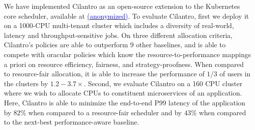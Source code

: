 
We have implemented Cilantro as an open-source extension to the Kubernetes core scheduler, available at \href{https://github.com}{\textcolor{blue}{(anonymized)}}. To evaluate Cilantro, first we deploy it on a 1000-CPU multi-tenant cluster which includes a diversity of real-world, latency and throughput-sensitive jobs.
On three different allocation criteria, Cilantro's policies are able to outperform 9 other
baselines, and is able
to compete with oracular policies
which know the resource-to-performance mappings a priori on resource
efficiency, fairness, and strategy-proofness.
When compared to resource-fair allocation, it is able to 
increase the
performance of $1/3$ of users in the clusters by $1.2-3.7\times$.
Second, we evaluate Cilantro on a 160 CPU cluster where we wish to
allocate CPUs to constituent microservices of an 
application. Here, Cilantro is able to minimize the end-to-end P99
latency of the application by
$82\%$ when compared to a resource-fair scheduler and by
$43\%$ when compared to the next-best performance-aware baseline.




